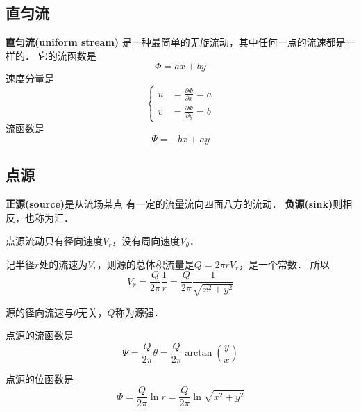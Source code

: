 \subsection{直匀流}
{\bfseries 直匀流(uniform stream)}
是一种最简单的无旋流动，其中任何一点的流速都是一样的．
它的流函数是
\[
  \Phi=ax+by
\]
速度分量是
\begin{equation*}
  \begin{cases}
    u & =\frac{\partial \Phi}{\partial x}=a \\
    v & =\frac{\partial \Phi}{\partial y}=b
  \end{cases}
\end{equation*}
流函数是
\[
  \Psi=-bx+ay
\]

\subsection{点源}
{\bfseries 正源(source)}是从流场某点
有一定的流量流向四面八方的流动．{\bfseries
负源(sink)}则相反，也称为汇．

\begin{note}
  点源流动只有径向速度$V_r$，没有周向速度$V_\theta$．
\end{note}

记半径$r$处的流速为$V_r$，则源的总体积流量是$Q=2
  \pi r V_r$，是一个常数．
所以
\[
  V_r=\frac{Q}{2\pi}\frac{1}{r }=\frac{Q}{2\pi}
  \frac{1}{\sqrt{x^2+y^2}}
\]
\begin{note}
  源的径向流速与$\theta$无关，$Q$称为源强．
\end{note}
点源的流函数是
\[
  \Psi=\frac{Q}{2\pi}\theta=\frac{Q}{2\pi}\arctan
  \left(\frac{y}{x}\right)
\]

点源的位函数是
\[
  \Phi=\frac{Q}{2\pi}\ln r =\frac{Q}{2\pi}
  \ln \sqrt{x^2+y^2}
\]



